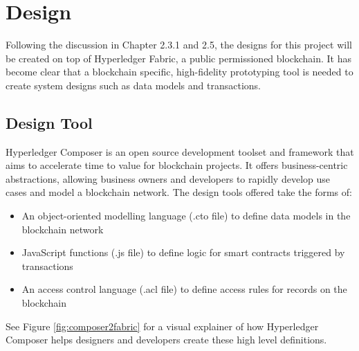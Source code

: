 \chapter{Design}
\graphicspath{{Chapter5/Figs/Raster/}{Chapter5/Figs/Tex/}{Chapter5/Figs/}}

Following the discussion in Chapter 2.3.1 and 2.5, the designs for this project
will be created on top of Hyperledger Fabric, a public permissioned blockchain.
It has become clear that a blockchain specific, high-fidelity prototyping tool is needed
to create system designs such as data models and transactions.

\section{Design Tool}

Hyperledger Composer is an open source development toolset and framework that aims to
accelerate time to value for blockchain projects. It offers business-centric
abstractions, allowing business owners and developers to rapidly develop
use cases and model a blockchain network. The design tools offered take the forms of:
\begin{itemize}
	\setlength\itemsep{0em}
	\item An object-oriented modelling language (.cto file) to define data models in
	      the blockchain network
	\item JavaScript functions (.js file) to define logic for smart contracts triggered by transactions
	\item An access control language (.acl file) to define access rules for records on the blockchain\\
	      \citep{official2018composer}
\end{itemize}

See Figure \ref{fig:composer2fabric} for a visual explainer of how Hyperledger Composer
helps designers and developers create these high level definitions.

